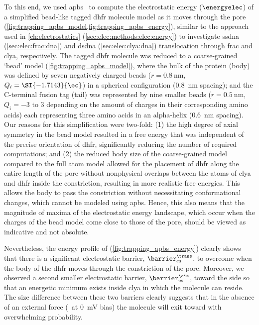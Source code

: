 To this end, we used \gls{apbs}~\cite{Baker-2001,Dolinsky-2004,Dolinsky-2007,Li-2005} to compute the
electrostatic energy ($\energyelec$) of a simplified bead-like tagged \gls{dhfr} molecule model as it moves
through the pore (\cref{fig:trapping_apbs_model,fig:trapping_apbs_energy}), similar to the approach used in
\cref{ch:electrostatics} (\cref{sec:elec:methods:elec:energy}) to investigate \gls{ssdna}
(\cref{sec:elec:frac:dna}) and \gls{dsdna} (\cref{sec:elec:clya:dna}) translocation through \gls{frac} and
\gls{clya}, respectively. The tagged \gls{dhfr} molecule was reduced to a coarse-grained `bead' model
(\cref{fig:trapping_apbs_model}), where the bulk of the protein (body) was defined by seven negatively charged
beads ($r = \SI{0.8}{\nm}$, $Q_i = \SI{-1.7143}{\ec}$) in a spherical configuration (\SI{0.8}{\nm} spacing);
and the C-terminal fusion tag (tail) was represented by nine smaller beads ($r = \SI{0.5}{\nm}$, $Q_i =
\num{-3}$ to \SI{+3}{\ec} depending on the amount of charges in their corresponding amino acids) each
representing three amino acids in an alpha-helix (\SI{0.6}{\nm}   spacing). Our reasons for this
simplification were two-fold: (1) the high degree of axial symmetry in the bead model resulted in a free
energy that was independent of the precise orientation of \gls{dhfr}, significantly reducing the number of
required computations; and (2) the reduced body size of the coarse-grained model compared to the full atom
model allowed for the placement of \gls{dhfr} along the entire length of the pore without nonphysical overlaps
between the atoms of \gls{clya} and \gls{dhfr} inside the \transi{} constriction, resulting in more realistic
free energies. This allows the body to pass the constriction without necessitating conformational changes,
which cannot be modeled using \gls{apbs}. Hence, this also means that the magnitude of maxima of the
electrostatic energy landscape, which occur when the charges of the bead model come close to those of the
pore, should be viewed as indicative and not absolute.

Nevertheless, the energy profile of \DHFRt{} (\cref{fig:trapping_apbs_energy}) clearly shows that there is a
significant electrostatic barrier, $\barrier^{\trans}_{\rm{es}}$, to overcome when the body of the \gls{dhfr}
moves through the constriction of the pore. Moreover, we observed a second smaller electrostatic barrier,
$\barrier^{\cis}_{\rm{es}}$, toward the \cisi{} side so that an energetic minimum exists inside \gls{clya} in
which the molecule can reside. The size difference between these two barriers clearly suggests that in the
absence of an external force (\ie~at \SI{0}{\mV} bias) the molecule will exit toward \cisi{} with overwhelming
probability.

